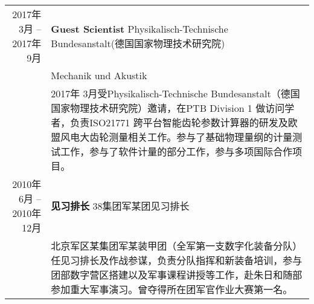 %
%


\renewcommand{\arraystretch}{1.5}
\begin{tabular}{rp{12cm}}	
	\textsc{2017年3月 --2017年9月}	& \textbf{Guest Scientist} Physikalisch-Technische Bundesanstalt(德国国家物理技术研究院) \\
									&  Mechanik und Akustik\\
									&  2017年 3月受Physikalisch-Technische Bundesanstalt（德国国家物理技术研究院）邀请，在PTB Division 1 做访问学者，负责ISO21771 跨平台智能齿轮参数计算器的研发及欧盟风电大齿轮测量相关工作。参与了基础物理量纲的计量测试工作，参与了软件计量的部分工作，参与多项国际合作项目。\\
	\textsc{2010年6月 --2010年12月}	& \textbf{见习排长} 38集团军某团见习排长 \\
									&  北京军区某集团军某装甲团（全军第一支数字化装备分队）任见习排长及作战参谋，负责分队指挥和新装备培训，参与团部数字营区搭建以及军事课程讲授等工作，赴朱日和随部参加重大军事演习。曾夺得所在团军官作业大赛第一名。\\
										
\end{tabular}